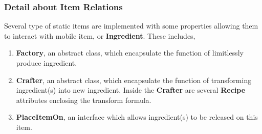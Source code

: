 \subsubsection{Detail about Item Relations}
Several type of static items are implemented with some properties allowing them to interact with mobile item, or \textbf{Ingredient}. These includes,
\begin{enumerate}
\item \textbf{Factory}, an abstract class, which encapsulate the function of limitlessly produce ingredient.
\item \textbf{Crafter}, an abstract class, which encapsulate the function of transforming ingredient(s) into new ingredient. Inside the \textbf{Crafter} are several \textbf{Recipe} attributes enclosing the transform formula.
\item \textbf{PlaceItemOn}, an interface which allows ingredient(s) to be  released on this item.
\end{enumerate}
